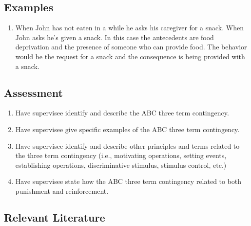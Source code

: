 \subsection{Examples}
\begin{enumerate}
\item When John has not eaten in a while he asks his caregiver for a snack. When John asks he's given a snack. In this case the antecedents are food deprivation and the presence of someone who can provide food. The behavior would be the request for a snack and the consequence is being provided with a snack.
%
\end{enumerate}
%
\subsection{Assessment}
\begin{enumerate}
\item Have supervisee identify and describe the ABC three term contingency.
\item Have supervisee give specific examples of the ABC three term contingency.
\item Have supervisee identify and describe other principles and terms related to the three term contingency (i.e., motivating operations, setting events, establishing operations, discriminative stimulus, stimulus control, etc.)
\item Have supervisee state how the ABC three term contingency related to both punishment and reinforcement.
\end{enumerate}
%
\subsection{Relevant Literature}
\begin{refsection}
\nocite{test,alang2017police,clayton2018black}
\printbibliography[heading=none]
\end{refsection}
%
